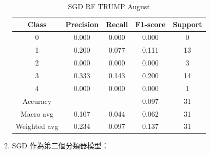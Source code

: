 \begin{enumerate}
\begin{enumerate}
\begin{table}[H]
                \vspace{1em}
                
                \scriptsize
                \begin{tabular}{c|cccc}
                \hline
                Class & Precision & Recall & F1-score & Support \\
                \hline
                0 & 0.000 & 0.000 & 0.000 & 0 \\
                1 & 0.200 & 0.077 & 0.111 & 13 \\
                2 & 0.000 & 0.000 & 0.000 & 3 \\
                3 & 0.333 & 0.143 & 0.200 & 14 \\
                4 & 0.000 & 0.000 & 0.000 & 1 \\
                \hline
                Accuracy &       &      & 0.097 & 31 \\
                Macro avg & 0.107 & 0.044 & 0.062 & 31 \\
                Weighted avg & 0.234 & 0.097 & 0.137 & 31 \\
                \hline
                \end{tabular}
                \caption{SGD RF TRUMP August}
                \label{tab:classifier_2_report_sgd_rf_trump_filtered_aug}
                \end{table}


                \pagebreak
    
                \item SGD 作為第二個分類器模型：


\end{enumerate}
\end{enumerate}
